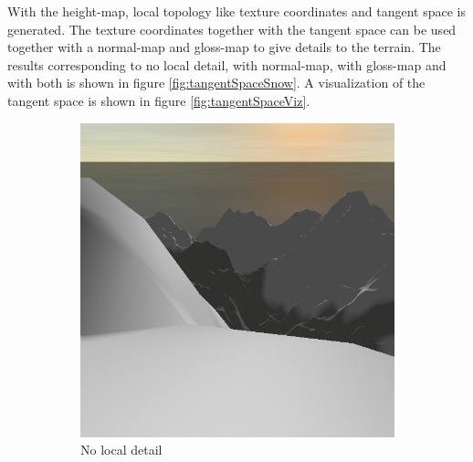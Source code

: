 \documentclass{article}
\begin{document}
With the height-map, local topology like texture coordinates and tangent space is generated.
The texture coordinates together with the tangent space can be used together with a normal-map and gloss-map to give details to the terrain. The results corresponding to no local detail, with normal-map, with gloss-map and with both is shown in figure \ref{fig:tangentSpaceSnow}. A visualization of the tangent space is shown in figure \ref{fig:tangentSpaceViz}.

\begin{figure}[H]
\centering
    \begin{subfigure}[b]{0.45\textwidth}
        \centering
        \includegraphics[scale=0.25]{noMap}
        \caption{No local detail}
        \label{fig:noMap}
    \end{subfigure}
    ~
    \begin{subfigure}[b]{0.45\textwidth}
        \centering

\end{subfigure}
\end{figure}
\end{document}
